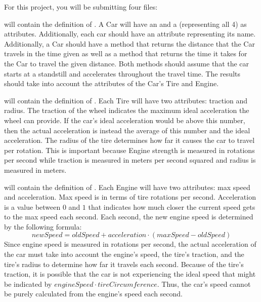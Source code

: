 \documentclass[11pt]{cselabheader}
\begin{document}
\begin{ex}
  For this project, you will be submitting four files:

   will contain the definition of . A
  Car will have an  and a   (representing all 4)
  as attributes. Additionally, each car should have an attribute representing its name.
  Additionally, a Car should have a method  that returns
  the distance that the Car travels in the time given as well as a method
   that returns the time it takes for the Car to travel
  the given distance. Both methods should assume that
  the car starts at a standstill and accelerates throughout the travel time. The results
  should take into account the attributes of the Car's Tire and Engine.
  
   will contain the definition of . Each Tire
  will have two attributes: traction and radius. The traction of the wheel indicates the
  maximum ideal acceleration the wheel can provide. If the car's ideal acceleration
  would be above this number, then the actual acceleration
  is instead the average of this number and the
  ideal acceleration. The radius of the tire determines how far it causes the
  car to travel per rotation. This is important because Engine strength is
  measured in rotations per second while traction is measured in meters
  per second squared and radius is measured in meters.
  
   will contain the definition of
  . Each Engine will have two attributes:
  max speed and acceleration. Max speed is in terms of tire rotations per
  second. Acceleration is a value between $0$ and $1$ that indicates how much
  closer the current speed gets to the max speed each second. Each second, the
  new engine speed is determined by the following formula:
  $$newSpeed = oldSpeed + acceleration \cdot \left(maxSpeed - oldSpeed\right)$$
  Since engine speed is measured in rotations per second, the actual
  acceleration of the car must take into account the engine's speed, the tire's
  traction, and the tire's radius to determine how far it travels each second.
  Because of the tire's traction, it is possible that the car is not
  experiencing the ideal speed that might be indicated by
  $engineSpeed \cdot tireCircumference$. Thus, the car's speed cannot be purely
  calculated from the engine's speed each second.


\end{ex}
\end{document}
